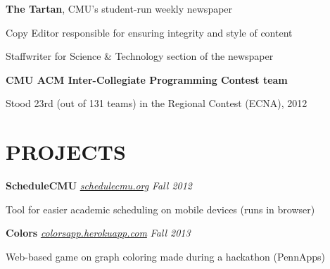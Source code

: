 \documentclass[margin, 11pt]{res} %
\begin{document}
\begin{resume}
\vspace{3pt}

{\bf The Tartan}, CMU's student-run weekly newspaper

\begin{itemize} \itemsep -2pt
{\small \item Copy Editor responsible for ensuring integrity and style of content
\item Staffwriter for Science \& Technology section of the newspaper}
\end{itemize}

\vspace{3pt}

{\bf CMU ACM Inter-Collegiate Programming Contest team}
\begin{itemize} \itemsep -2pt
{\small \item Stood 23rd (out of 131 teams) in the Regional Contest (ECNA), 2012}
\end{itemize}

\section{PROJECTS}

{\bf ScheduleCMU} \href{www.schedulecmu.org}{\sl schedulecmu.org} \hfill {\sl Fall 2012}

\begin{itemize} \itemsep -2pt
{\small \item Tool for easier academic scheduling on mobile devices (runs in browser)}
\end{itemize}

\vspace{3pt}

{\bf Colors} \href{colorsapp.herokuapp.com}{\sl colorsapp.herokuapp.com} \hfill {\sl Fall 2013}
\begin{itemize} \itemsep -2pt
{\small \item Web-based game on graph coloring made during a hackathon (PennApps)}
\end{itemize}




\end{resume}
\end{document}

